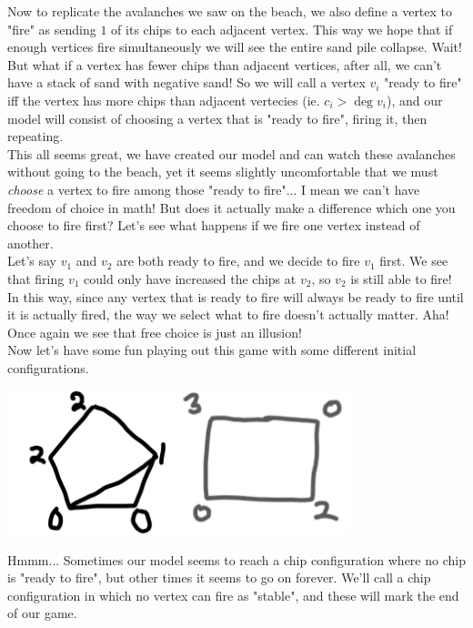 \documentclass{article}
\begin{document}
Now to replicate the avalanches we saw on the beach, we also define a vertex to "fire" as sending $1$ of its chips to each adjacent vertex. This way we hope that if enough vertices fire simultaneously we will see the entire sand pile collapse. Wait! But what if a vertex has fewer chips than adjacent vertices, after all, we can't have a stack of sand with negative sand! So we will call a vertex $v_i$ "ready to fire" iff the vertex has more chips than adjacent vertecies (ie. $c_i>\deg{v_i}$), and our model will consist of choosing a vertex that is "ready to fire", firing it, then repeating.\\

This all seems great, we have created our model and can watch these avalanches without going to the beach, yet it seems slightly uncomfortable that we must \emph{choose} a vertex to fire among those "ready to fire"... I mean we can't have freedom of choice in math! But does it actually make a difference which one you choose to fire first? Let's see what happens if we fire one vertex instead of another.\\

Let's say $v_1$ and $v_2$ are both ready to fire, and we decide to fire $v_1$ first. We see that firing $v_1$ could only have increased the chips at $v_2$, so $v_2$ is still able to fire! In this way, since any vertex that is ready to fire will always be ready to fire until it is actually fired, the way we select what to fire doesn't actually matter. Aha! Once again we see that free choice is just an illusion!\\

Now let's have some fun playing out this game with some different initial configurations. 

\begin{center}
    \includegraphics[width=10cm]{images/example configs.png}
\end{center}

Hmmm... Sometimes our model seems to reach a chip configuration where no chip is "ready to fire", but other times it seems to go on forever. We'll call a chip configuration in which no vertex can fire as "stable", and these will mark the end of our game. \\
\end{document}

